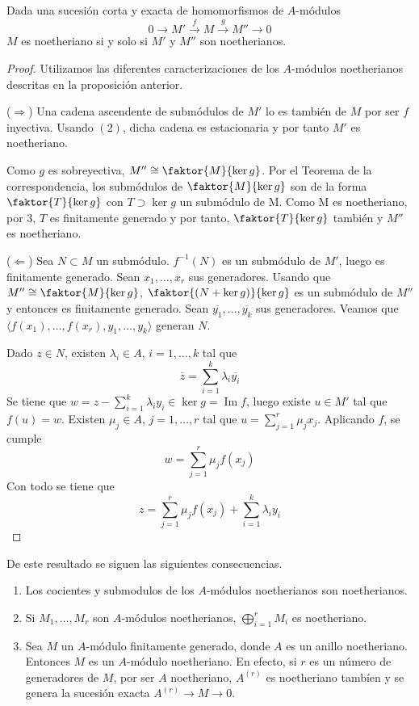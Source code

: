 \documentclass[../main.tex]{subfiles}
\begin{document}
	\begin{proposition}
		Dada una sucesión corta y exacta de homomorfismos de $A$-módulos $$0\longrightarrow M'\overset{f}{\longrightarrow}M\overset{g}{\longrightarrow}M''\longrightarrow 0$$ $M$ es noetheriano si y solo si $M'$ y $M''$ son noetherianos.
	\end{proposition}
	\begin{proof} Utilizamos las diferentes caracterizaciones de los $A$-módulos noetherianos descritas en la proposición anterior.
		
		($\Longrightarrow$) Una cadena ascendente de submódulos de $M'$ lo es también de $M$ por ser $f$ inyectiva. Usando $(2)$, dicha cadena es estacionaria y por tanto $M'$ es noetheriano.
		
		Como $g$ es sobreyectiva, $M''\cong\faktor{M}{\operatorname{ker} g}$. Por el Teorema de la correspondencia, los submódulos de $\faktor{M}{\operatorname{ker} g}$ son de la forma $\faktor{T}{\operatorname{ker} g}$ con $T\supset \operatorname{ker} g$ un submódulo de M. Como M es noetheriano, por $3$, $T$ es finitamente generado y por tanto, $\faktor{T}{\operatorname{ker} g}$ también y $M''$ es noetheriano.
		
		($\Longleftarrow$) Sea $N\subset M$ un submódulo. $f^{-1}(N)$ es un submódulo de $M'$, luego es finitamente generado. Sean $x_1,\dots,x_r$ sus generadores. Usando que $M''\cong\faktor{M}{\operatorname{ker} g}$, $\faktor{(N+\operatorname{ker} g)}{\operatorname{ker} g}$ es un submódulo de $M''$ y entonces es finitamente generado. Sean $\overline{y_1},\dots,\overline{y_k}$ sus generadores. Veamos que $\langle f(x_1),\dots,f(x_r),y_1,\dots,y_k\rangle$ generan $N$.
		
		Dado $z\in N$, existen $\lambda_i\in A$, $i=1,\dots,k$ tal que $$\overline{z}=\sum_{i=1}^k\lambda_i\overline{y_i}$$ Se tiene que $w=z-\sum_{i=1}^k\lambda_iy_i\in\operatorname{ker} g=\operatorname{Im} f$, luego existe $u\in M'$ tal que $f(u)=w$. Existen $\mu_j\in A$, $j=1,\dots,r$ tal que $u=\sum_{j=1}^r\mu_jx_j$. Aplicando $f$, se cumple $$w=\sum_{j=1}^r\mu_jf(x_j)$$ Con todo se tiene que $$z=\sum_{j=1}^r\mu_jf(x_j)+\sum_{i=1}^k\lambda_iy_i$$
	\end{proof}
	\begin{remark}
		De este resultado se siguen las siguientes consecuencias.\begin{enumerate}
			\item Los cocientes y submodulos de los $A$-módulos noetherianos son noetherianos.
			\item Si $M_1,\dots,M_r$ son $A$-módulos noetherianos, $\bigoplus_{i=1}^rM_i$ es noetheriano.
			\item Sea $M$ un $A$-módulo finitamente generado, donde $A$ es un anillo noetheriano. Entonces $M$ es un $A$-módulo noetheriano. En efecto, si $r$ es un número de generadores de $M$, por ser $A$ noetheriano, $A^{(r)}$ es noetheriano tambíen y se genera la sucesión exacta $A^{(r)}\rightarrow M\rightarrow 0$.
		\end{enumerate}
	\end{remark}
\end{document}

